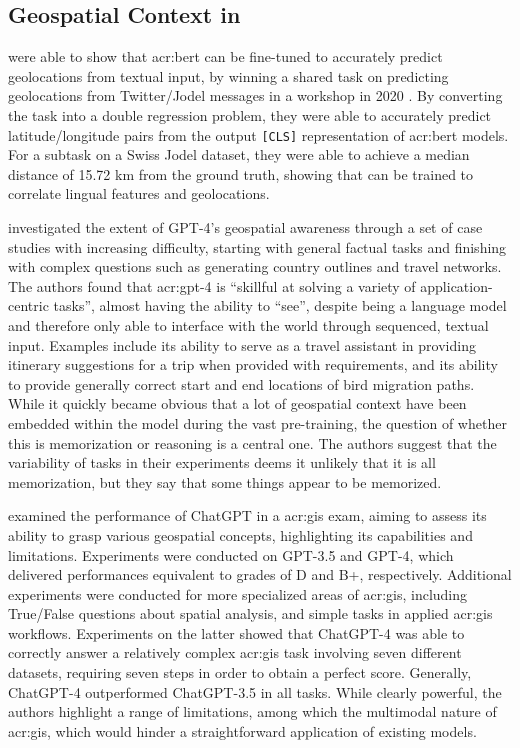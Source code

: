 \subsection[Geospatial Context in LLMs]{Geospatial Context in }

\cite{scherrerHeLjuVarDial20202020} were able to show that \acrshort{acr:bert} can be fine-tuned to accurately predict geolocations from textual input, by winning a shared task on predicting geolocations from Twitter/Jodel messages in a workshop in 2020 \citep{gamanReportVarDialEvaluation2020}. By converting the task into a double regression problem, they were able to accurately predict latitude/longitude pairs from the output \texttt{[CLS]} representation of \acrshort{acr:bert} models. For a subtask on a Swiss Jodel dataset, they were able to achieve a median distance of 15.72 km from the ground truth, showing that  can be trained to correlate lingual features and geolocations.

\cite{robertsGPT4GEOHowLanguage2023} investigated the extent of GPT-4's geospatial awareness through a set of case studies with increasing difficulty, starting with general factual tasks and finishing with complex questions such as generating country outlines and travel networks. The authors found that \acrshort{acr:gpt}-4 is \enquote{skillful at solving a variety of application-centric tasks}, almost having the ability to \enquote{see}, despite being a language model and therefore only able to interface with the world through sequenced, textual input. Examples include its ability to serve as a travel assistant in providing itinerary suggestions for a trip when provided with requirements, and its ability to provide generally correct start and end locations of bird migration paths. While it quickly became obvious that a lot of geospatial context have been embedded within the model during the vast pre-training, the question of whether this is memorization or reasoning is a central one. The authors suggest that the variability of tasks in their experiments deems it unlikely that it is all memorization, but they say that some things appear to be memorized.

\cite{mooneyUnderstandingGeospatialSkills2023} examined the performance of ChatGPT in a \acrfull{acr:gis} exam, aiming to assess its ability to grasp various geospatial concepts, highlighting its capabilities and limitations. Experiments were conducted on GPT-3.5 and GPT-4, which delivered performances equivalent to grades of D and B+, respectively. Additional experiments were conducted for more specialized areas of \acrshort{acr:gis}, including True/False questions about spatial analysis, and simple tasks in applied \acrshort{acr:gis} workflows. Experiments on the latter showed that ChatGPT-4 was able to correctly answer a relatively complex \acrshort{acr:gis} task involving seven different datasets, requiring seven steps in order to obtain a perfect score. Generally, ChatGPT-4 outperformed ChatGPT-3.5 in all tasks. While clearly powerful, the authors highlight a range of limitations, among which the multimodal nature of \acrshort{acr:gis}, which would hinder a straightforward application of existing models.

